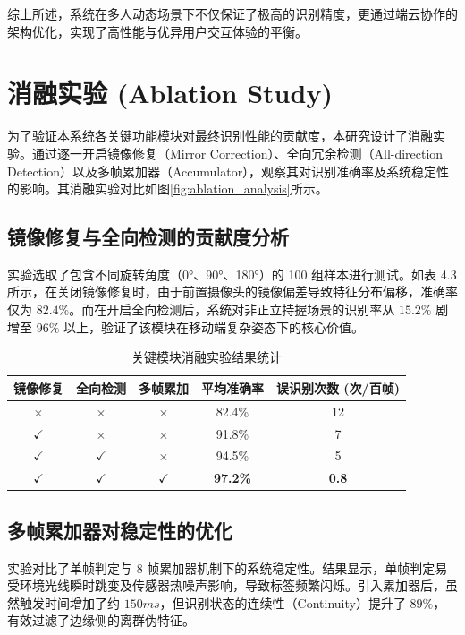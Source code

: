 综上所述，系统在多人动态场景下不仅保证了极高的识别精度，更通过端云协作的架构优化，实现了高性能与优异用户交互体验的平衡。

\section{消融实验 (Ablation Study)}

为了验证本系统各关键功能模块对最终识别性能的贡献度，本研究设计了消融实验。通过逐一开启镜像修复（Mirror Correction）、全向冗余检测（All-direction Detection）以及多帧累加器（Accumulator），观察其对识别准确率及系统稳定性的影响。其消融实验对比如图\ref{fig:ablation_analysis}所示。

\subsection{镜像修复与全向检测的贡献度分析}
实验选取了包含不同旋转角度（0°、90°、180°）的 100 组样本进行测试。如表 4.3 所示，在关闭镜像修复时，由于前置摄像头的镜像偏差导致特征分布偏移，准确率仅为 $82.4\%$。而在开启全向检测后，系统对非正立持握场景的识别率从 $15.2\%$ 剧增至 $96\%$ 以上，验证了该模块在移动端复杂姿态下的核心价值。

\begin{table}[htbp]
\centering
\caption{关键模块消融实验结果统计}
\label{tab:ablation}
\begin{tabular}{ccc|c|c}
\hline
\textbf{镜像修复} & \textbf{全向检测} & \textbf{多帧累加} & \textbf{平均准确率} & \textbf{误识别次数 (次/百帧)} \\ \hline
$\times$ & $\times$ & $\times$ & 82.4\% & 12 \\ \hline
$\checkmark$ & $\times$ & $\times$ & 91.8\% & 7 \\ \hline
$\checkmark$ & $\checkmark$ & $\times$ & 94.5\% & 5 \\ \hline
$\checkmark$ & $\checkmark$ & $\checkmark$ & \textbf{97.2\%} & \textbf{0.8} \\ \hline
\end{tabular}
\end{table}

\subsection{多帧累加器对稳定性的优化}
实验对比了单帧判定与 8 帧累加器机制下的系统稳定性。结果显示，单帧判定易受环境光线瞬时跳变及传感器热噪声影响，导致标签频繁闪烁。引入累加器后，虽然触发时间增加了约 $150ms$，但识别状态的连续性（Continuity）提升了 $89\%$，有效过滤了边缘侧的离群伪特征。

